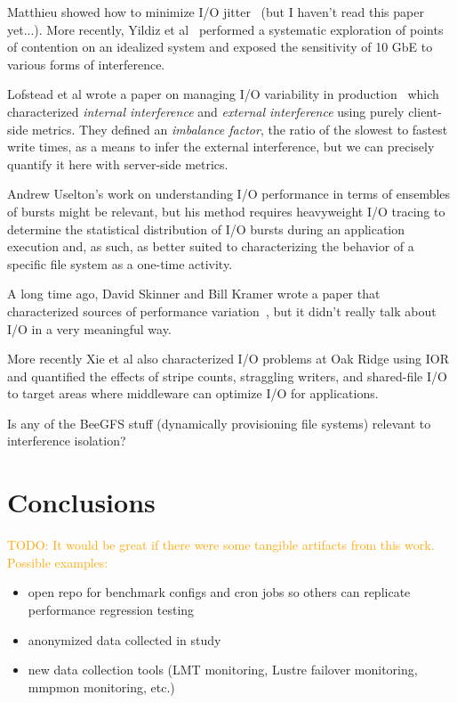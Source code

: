 \documentclass[conference,10pt,compsocconf]{IEEEtran}
\newcommand{\todo}[1]{\textcolor{Orange}{TODO: #1}}
\begin{document}
Matthieu showed how to minimize I/O jitter~\cite{Dorier2012} (but I haven't read
this paper yet...).  More recently, Yildiz et al~\cite{Yildiz2016} performed
a systematic exploration of points of contention on an idealized system and
exposed the sensitivity of 10 GbE to various forms of interference.

Lofstead et al wrote a paper on managing I/O variability in production~
\cite{Lofstead2010} which characterized \emph{internal interference} and
\emph{external interference} using purely client-side metrics.  They defined an
\emph{imbalance factor}, the ratio of the slowest to fastest write times, as a
means to infer the external interference, but we can precisely quantify it here
with server-side metrics.

Andrew Uselton's work on understanding I/O performance in terms of ensembles of
bursts might be relevant\cite{Uselton2010}, but his method requires heavyweight
I/O tracing to determine the statistical distribution of I/O bursts during an
application execution and, as such, as better suited to characterizing the
behavior of a specific file system as a one-time activity.

A long time ago, David Skinner and Bill Kramer wrote a paper that characterized
sources of performance variation~\cite{Skinner2005}, but it didn't really talk
about I/O in a very meaningful way.

More recently Xie et al also characterized I/O problems at Oak
Ridge\cite{Xie2012} using IOR and quantified the effects of stripe counts,
straggling writers, and shared-file I/O to target areas where middleware can
optimize I/O for applications.

Is any of the BeeGFS stuff (dynamically provisioning file systems) relevant to
interference isolation?

\section{Conclusions} \label{sec:conclusions}

\todo{It would be great if there were some tangible artifacts from this work.
Possible examples:}
\begin{itemize}
\item open repo for benchmark configs and cron jobs so others can replicate
performance regression testing
\item anonymized data collected in study
\item new data collection tools (LMT monitoring, Lustre failover monitoring,
mmpmon monitoring, etc.)
\end{itemize}
\end{document}
